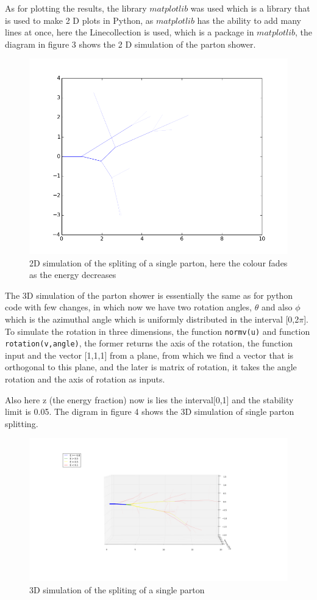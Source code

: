 As for plotting the results, the library $matplotlib$ was used which is a library that is used to make 2 D plots in Python, as $matplotlib$ has the ability to add many lines at once, here the Linecollection is used, which is a package in $matplotlib$, the diagram in figure 3 shows the 2 D simulation of the parton shower.  \begin{figure}[H]
\centering
\includegraphics[scale=.5]{images/2D_partonshower.png}
\caption{2D simulation of the spliting of a single parton, here the colour fades as the energy decreases}
\end{figure}

The 3D simulation of the parton shower is essentially the same as for python code with few changes, in which now we have two rotation angles, $\theta$ and also $\phi$ which is the azimuthal angle which is uniformly distributed in the interval [0,2$\pi$]. To simulate the rotation in three dimensions, the function \verb+normv(u)+ and function \verb!rotation(v,angle)!, the former returns the axis of the rotation, the function input and the vector [1,1,1] from a plane, from which we find a vector that is orthogonal to this plane, and the later is matrix of rotation, it takes the angle rotation and the axis of rotation as inputs. 

Also here z (the energy fraction) now is lies the interval[0,1] and the stability limit is 0.05. The digram in figure 4 shows the 3D simulation of single parton splitting.

 
 \begin{figure}[H]
\centering
\includegraphics[scale=.3]{images/3D_partonshower.png}
\caption{3D simulation of the spliting of a single parton}
\end{figure}
